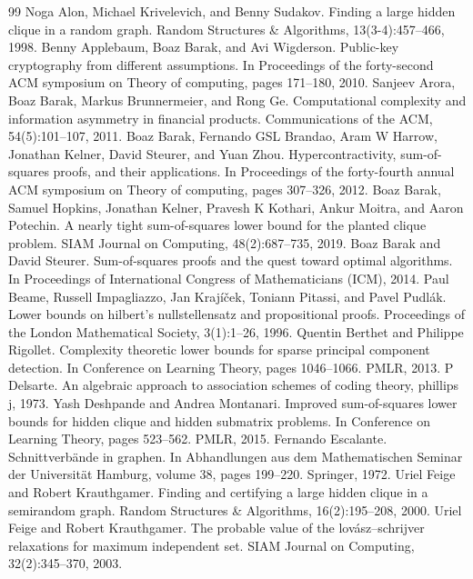 \documentclass[10pt,a4paper]{article}
\begin{document}
\begin{thebibliography}{99}
 Noga Alon, Michael Krivelevich, and Benny Sudakov. Finding a large hidden clique in a random graph. Random Structures \& Algorithms, 13(3-4):457–466, 1998.
 Benny Applebaum, Boaz Barak, and Avi Wigderson. Public-key cryptography from different assumptions. In Proceedings of the forty-second ACM symposium on Theory of computing, pages 171–180, 2010.
 Sanjeev Arora, Boaz Barak, Markus Brunnermeier, and Rong Ge. Computational complexity and information asymmetry in financial products. Communications of the ACM, 54(5):101–107, 2011.
 Boaz Barak, Fernando GSL Brandao, Aram W Harrow, Jonathan Kelner, David Steurer, and Yuan Zhou. Hypercontractivity, sum-of-squares proofs, and their applications. In Proceedings of the forty-fourth annual ACM symposium on Theory of computing, pages 307–326, 2012.
 Boaz Barak, Samuel Hopkins, Jonathan Kelner, Pravesh K Kothari, Ankur Moitra, and Aaron Potechin. A nearly tight sum-of-squares lower bound for the planted clique problem. SIAM Journal on Computing, 48(2):687–735, 2019.
 Boaz Barak and David Steurer. Sum-of-squares proofs and the quest toward optimal algorithms. In Proceedings of International Congress of Mathematicians (ICM), 2014.
 Paul Beame, Russell Impagliazzo, Jan Krajíček, Toniann Pitassi, and Pavel Pudlák. Lower bounds on hilbert’s nullstellensatz and propositional proofs. Proceedings of the London Mathematical Society, 3(1):1–26, 1996.
 Quentin Berthet and Philippe Rigollet. Complexity theoretic lower bounds for sparse principal component detection. In Conference on Learning Theory, pages 1046–1066. PMLR, 2013.
 P Delsarte. An algebraic approach to association schemes of coding theory, phillips j, 1973.
 Yash Deshpande and Andrea Montanari. Improved sum-of-squares lower bounds for hidden clique and hidden submatrix problems. In Conference on Learning Theory, pages 523–562. PMLR, 2015.
 Fernando Escalante. Schnittverbände in graphen. In Abhandlungen aus dem Mathematischen Seminar der Universität Hamburg, volume 38, pages 199–220. Springer, 1972.
 Uriel Feige and Robert Krauthgamer. Finding and certifying a large hidden clique in a semirandom graph. Random Structures \& Algorithms, 16(2):195–208, 2000.
 Uriel Feige and Robert Krauthgamer. The probable value of the lovász–schrijver relaxations for maximum independent set. SIAM Journal on Computing, 32(2):345–370, 2003.

\end{thebibliography}
\end{document}
